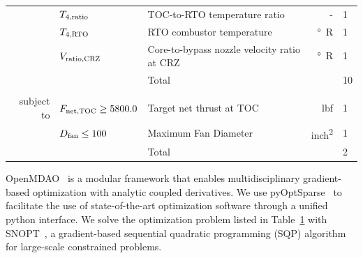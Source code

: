 \documentclass[conf]{new-aiaa}
\begin{document}
\begin{table}[hbt!]
\begin{tabular}{r l l r l}
                        & $T_{4,\rm{ratio}}$             & TOC-to-RTO temperature ratio                & -              & 1        \\
                        & $T_{4,\rm{RTO}}$               & RTO combustor temperature                   & \si{\degree R} & 1        \\
                        & $V_{\rm{ratio,CRZ}}$           & Core-to-bypass nozzle velocity ratio at CRZ & \si{\degree R} & 1        \\
        \cline{3-5}
                        &                                & Total                                       &                & 10       \\
                        &                                &                                             &                &          \\
        subject to      & $F_{\rm{net,TOC}} \geq 5800.0$ & Target net thrust at TOC                    & \si{lbf}       & 1        \\
                        & $D_{\rm{fan}} \leq 100$        & Maximum Fan Diameter                        & \si{inch^2}    & 1        \\
        \cline{3-5}
                        &                                & Total                                       &                & 2        \\
        \bottomrule
    \end{tabular}
    \label{tab:opt_problem}
\end{table}

OpenMDAO~\cite{Gray2019a} is a modular framework that enables multidisciplinary gradient-based optimization with analytic coupled derivatives.
We use pyOptSparse~\cite{Wu2020a} to facilitate the use of state-of-the-art optimization software through a unified python interface.
We solve the optimization problem listed in Table~\ref{tab:opt_problem} with SNOPT~\cite{Gill2005a}, a gradient-based sequential quadratic programming (SQP) algorithm for large-scale constrained problems.
\end{document}
